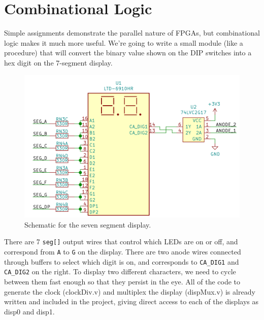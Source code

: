 \documentclass[12pt,a4paper]{article}
\begin{document}
\newpage
\section{Combinational Logic}
Simple assignments demonstrate the parallel nature of FPGAs, but combinational logic makes it much more useful. We’re going to write a small module (like a procedure) that will convert the binary value shown on the DIP switches into a hex digit on the 7-segment display.

\begin{figure}[H]
	\begin{centering}
		\includegraphics[width=\linewidth]{sevenSeg.png}
		\caption{Schematic for the seven segment display.}
	\end{centering}
\end{figure}
\noindent
There are 7 \texttt{seg[]} output wires that control which LEDs are on or off, and correspond from \texttt{A} to \texttt{G} on the display. There are two anode wires connected through buffers to select which digit is on, and corresponds to \texttt{CA\_DIG1} and \texttt{CA\_DIG2} on the right. To display two different characters, we need to cycle between them fast enough so that they persist in the eye. All of the code to generate the clock (clockDiv.v) and multiplex the display (dispMux.v) is already written and included in the project, giving direct access to each of the displays as disp0 and disp1.
\end{document}
